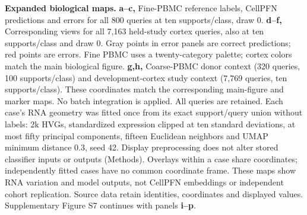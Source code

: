 \textbf{Expanded biological maps.}
\textbf{a--c,} Fine-PBMC reference labels, CellPFN predictions and errors for all 800 queries at ten supports/class, draw 0.
\textbf{d--f,} Corresponding views for all 7,163 held-study cortex queries, also at ten supports/class and draw 0. Gray points in error panels are correct predictions; red points are errors. Fine PBMC uses a twenty-category palette; cortex colors match the main biological figure.
\textbf{g,h,} Coarse-PBMC donor context (320 queries, 100 supports/class) and development-cortex study context (7,769 queries, ten supports/class). These coordinates match the corresponding main-figure and marker maps. No batch integration is applied.
All queries are retained. Each case's RNA geometry was fitted once from its exact support/query union without labels: 2k HVGs, standardized expression clipped at ten standard deviations, at most fifty principal components, fifteen Euclidean neighbors and UMAP minimum distance 0.3, seed 42. Display preprocessing does not alter stored classifier inputs or outputs (Methods). Overlays within a case share coordinates; independently fitted cases have no common coordinate frame. These maps show RNA variation and model outputs, not CellPFN embeddings or independent cohort replication. Source data retain identities, coordinates and displayed values. Supplementary Figure S7 continues with panels \textbf{i--p}.
